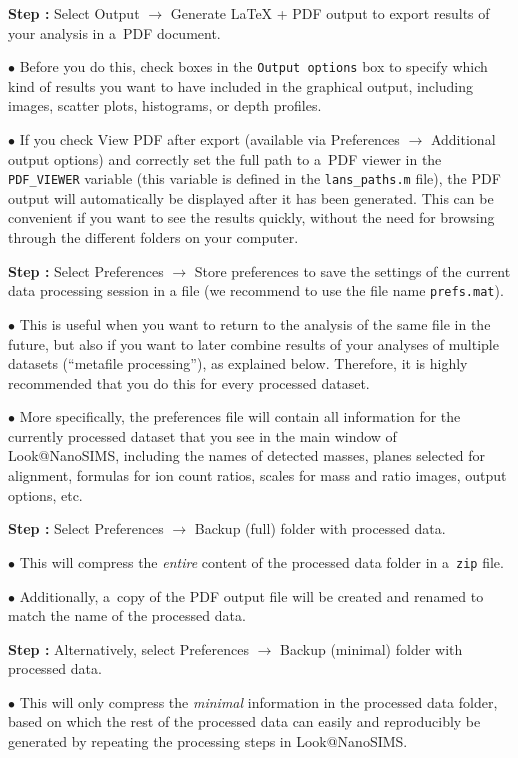 \documentclass[a4paper, 11pt]{article}
\newcommand{\ttt}[1]{\texttt{#1}}
\newcommand{\lans}[1]{{\color{magenta}#1}}
\newcommand{\lanscb}[1]{{\color{darkgreen}#1}}
\newcommand\ra{\rightarrow}
\newcounter{step}
\newcommand\s{\addtocounter{step}{1}\noindent\textbf{Step \thestep:}{ }}
\newcommand\bul{\noindent$\bullet${ }}
\begin{document}
\s Select \lans{Output} $\ra$ \lans{Generate LaTeX + PDF output} to export results of your analysis in a~PDF document. 

\bul Before you do this, check boxes in the \ttt{Output options} box to specify which kind of results you want to have included in the graphical output, including  \lanscb{images}, \lanscb{scatter plots}, \lanscb{histograms}, or \lanscb{depth profiles}.

\bul If you check \lanscb{View PDF after export} (available via \lans{Preferences} $\ra$ \lans{Additional output options}) and correctly set the full path to a~PDF viewer in the \ttt{PDF\_VIEWER} variable (this variable is defined in the \ttt{lans\_paths.m} file), the PDF output will automatically be displayed after it has been generated. This can be convenient if you want to see the results quickly, without the need for browsing through the different folders on your computer.

\s Select \lans{Preferences} $\ra$ \lans{Store preferences} to save the settings of the current data processing session in a file (we recommend to use the file name \ttt{prefs.mat}). 

\bul This is useful when you want to return to the analysis of the same file in the future, but also if you want to later combine results of your analyses of multiple datasets (``metafile processing''), as explained below. Therefore, it is highly recommended that you do this for every processed dataset.

\bul More specifically, the preferences file will contain all information for the currently processed dataset that you see in the main window of Look@NanoSIMS, including the names of detected masses, planes selected for alignment, formulas for ion count ratios, scales for mass and ratio images, output options, etc.

\s Select \lans{Preferences} $\ra$ \lans{Backup (full) folder with processed data}.

\bul This will compress the \emph{entire} content of the processed data folder in a~\ttt{zip} file.

\bul Additionally, a~copy of the PDF output file will be created and renamed to match the name of the processed data.

\s Alternatively, select \lans{Preferences} $\ra$ \lans{Backup (minimal) folder with processed data}.

\bul This will only compress the \emph{minimal} information in the processed data folder, based on which the rest of the processed data can easily and reproducibly be generated by repeating the processing steps in Look@NanoSIMS. 
\end{document}

